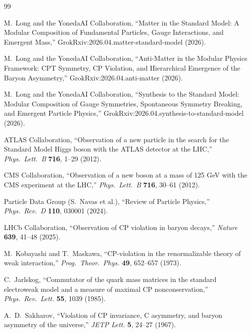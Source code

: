 \documentclass[12pt]{article}
\theoremstyle{definition}
\theoremstyle{remark}
\begin{document}
\begin{thebibliography}{99}

M.~Long and the YonedaAI Collaboration, ``Matter in the Standard Model: A Modular Composition of Fundamental Particles, Gauge Interactions, and Emergent Mass,'' GrokRxiv:2026.04.matter-standard-model (2026).

M.~Long and the YonedaAI Collaboration, ``Anti-Matter in the Modular Physics Framework: CPT Symmetry, CP Violation, and Hierarchical Emergence of the Baryon Asymmetry,'' GrokRxiv:2026.04.anti-matter (2026).

M.~Long and the YonedaAI Collaboration, ``Synthesis to the Standard Model: Modular Composition of Gauge Symmetries, Spontaneous Symmetry Breaking, and Emergent Particle Physics,'' GrokRxiv:2026.04.synthesis-to-standard-model (2026).

ATLAS Collaboration, ``Observation of a new particle in the search for the Standard Model Higgs boson with the ATLAS detector at the LHC,'' \textit{Phys.\ Lett.\ B} \textbf{716}, 1--29 (2012).

CMS Collaboration, ``Observation of a new boson at a mass of 125 GeV with the CMS experiment at the LHC,'' \textit{Phys.\ Lett.\ B} \textbf{716}, 30--61 (2012).

Particle Data Group (S.~Navas et al.), ``Review of Particle Physics,'' \textit{Phys.\ Rev.\ D} \textbf{110}, 030001 (2024).

LHCb Collaboration, ``Observation of CP violation in baryon decays,'' \textit{Nature} \textbf{639}, 41--48 (2025).

M.~Kobayashi and T.~Maskawa, ``CP-violation in the renormalizable theory of weak interaction,'' \textit{Prog.\ Theor.\ Phys.} \textbf{49}, 652--657 (1973).

C.~Jarlskog, ``Commutator of the quark mass matrices in the standard electroweak model and a measure of maximal CP nonconservation,'' \textit{Phys.\ Rev.\ Lett.} \textbf{55}, 1039 (1985).

A.~D.~Sakharov, ``Violation of CP invariance, C asymmetry, and baryon asymmetry of the universe,'' \textit{JETP Lett.} \textbf{5}, 24--27 (1967).


\end{thebibliography}
\end{document}
